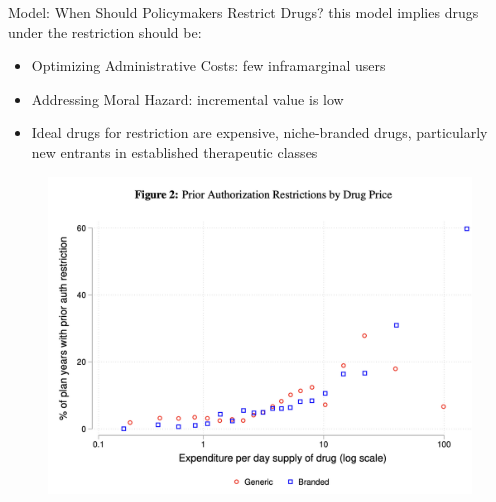 \begin{frame}{Model: When Should Policymakers Restrict Drugs?}
    this model implies drugs under the restriction should be: 
    \begin{itemize}
        \item Optimizing Administrative Costs: few inframarginal users
        \item Addressing Moral Hazard: incremental value is low
        \item Ideal drugs for restriction are expensive, niche-branded drugs, particularly new entrants in established therapeutic classes
    \end{itemize}
    \begin{figure}
        \centering
        \includegraphics[width=0.5\linewidth]{fig2-price-restriction.png}
    \end{figure}
\end{frame}
